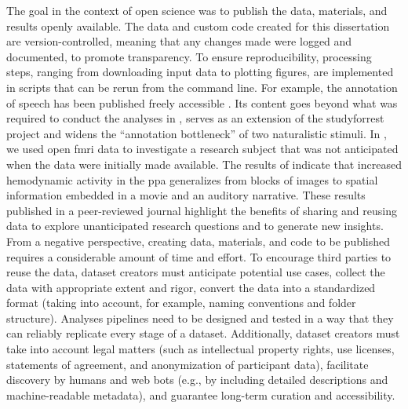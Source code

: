

%

%
The goal in the context of open science was to publish the data, materials, and
results openly available.
%
The data and custom code created for this dissertation are version-controlled,
meaning that any changes made were logged and documented, to promote
transparency.
%
To ensure reproducibility, processing steps, ranging from downloading input data
to plotting figures, are implemented in scripts that can be rerun from the
command line.
%
For example, the annotation of speech has been published freely accessible
\citep{haeusler2021speechanno}.
%
Its content goes beyond what was required to conduct the analyses in
\citet{haeusler2022processing}, serves as an extension of the studyforrest
project and widens the ``annotation bottleneck'' \citep[][p.
16]{aliko2020naturalistic} of two naturalistic stimuli.
%
In \citet{haeusler2022processing}, we used open \ac{fmri} data to investigate a
research subject that was not anticipated when the data were initially made
available.
%
The results of \citet{haeusler2022processing} indicate that increased
hemodynamic activity in the \ac{ppa} generalizes from blocks of images to
spatial information embedded in a movie and an auditory narrative.
%
These results published in a peer-reviewed journal highlight the benefits of
sharing and reusing data to explore unanticipated research questions and to
generate new insights.
From a negative perspective, creating data, materials, and code to be published
requires a considerable amount of time and effort.
%
To encourage third parties to reuse the data, dataset creators must anticipate
potential use cases, collect the data with appropriate extent and rigor, convert
the data into a standardized format (taking into account, for example, naming
conventions and folder structure).
Analyses pipelines need to be designed and tested in a way that they can
reliably replicate every stage of a dataset.
Additionally, dataset creators must take into account legal matters (such as
intellectual property rights, use licenses, statements of agreement, and
anonymization of participant data), facilitate discovery by humans and web bots
(e.g., by including detailed descriptions and machine-readable metadata), and
guarantee long-term curation and accessibility.

